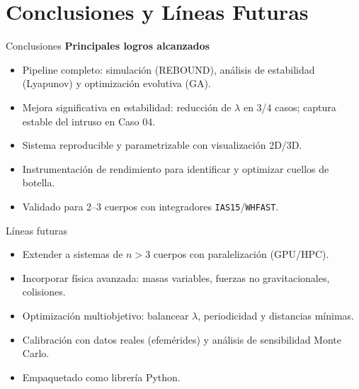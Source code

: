 \section[Conclusiones]{Conclusiones y Líneas Futuras}
\begin{frame}{Conclusiones}
    \textbf{Principales logros alcanzados}
    \begin{itemize}
        \item Pipeline completo: simulación (REBOUND), análisis de estabilidad (Lyapunov) y optimización evolutiva (GA).
        \item Mejora significativa en estabilidad: reducción de $\lambda$ en 3/4 casos; captura estable del intruso en Caso 04.
        \item Sistema reproducible y parametrizable con visualización 2D/3D.
        \item Instrumentación de rendimiento para identificar y optimizar cuellos de botella.
        \item Validado para 2–3 cuerpos con integradores \texttt{IAS15}/\texttt{WHFAST}.
    \end{itemize}
\end{frame}

\begin{frame}{Líneas futuras}
    \begin{itemize}
        \item Extender a sistemas de $n>3$ cuerpos con paralelización (GPU/HPC).
        \item Incorporar física avanzada: masas variables, fuerzas no gravitacionales, colisiones.
        \item Optimización multiobjetivo: balancear $\lambda$, periodicidad y distancias mínimas.
        \item Calibración con datos reales (efemérides) y análisis de sensibilidad Monte Carlo.
        \item Empaquetado como librería Python.
    \end{itemize}
\end{frame}
